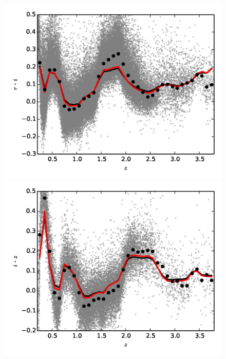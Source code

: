 \begin{figure}
\begin{minipage}[b]{0.49\textwidth}
    \includegraphics[width=\textwidth]{figures/chapter06/ri.jpg}
  \end{minipage}
  \begin{minipage}[b]{0.49\textwidth}
    \includegraphics[width=\textwidth]{figures/chapter06/iz.jpg}
  \end{minipage} \\
\begin{minipage}[b]{0.49\textwidth}

\end{minipage}
\end{figure}
